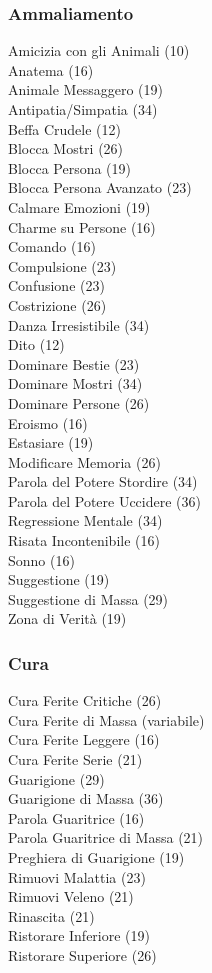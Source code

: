 \begin{multicols}{3}
	\subsubsection{Ammaliamento}
	Amicizia con gli Animali (10)	\\
	Anatema (16)\\
	Animale Messaggero (19)\\
	Antipatia/Simpatia (34)\\
	Beffa Crudele (12)\\
	Blocca Mostri (26)\\
	Blocca Persona (19)\\
	Blocca Persona Avanzato (23)\\
	Calmare Emozioni (19)\\
	Charme su Persone (16)\\
	Comando (16)\\
	Compulsione (23)\\
	Confusione (23)\\
	Costrizione (26)\\
	Danza Irresistibile (34)\\
	Dito (12)\\
	Dominare Bestie (23)\\
	Dominare Mostri (34)\\
	Dominare Persone (26)\\
	Eroismo (16)\\
	Estasiare (19)\\
	Modificare Memoria (26)\\
	Parola del Potere Stordire (34)\\
	Parola del Potere Uccidere (36)\\
	Regressione Mentale (34)\\
	Risata Incontenibile (16)\\
	Sonno (16)\\
	Suggestione (19)\\
	Suggestione di Massa (29)\\
	Zona di Verità (19)\\
	
	\subsubsection{Cura}
Cura Ferite Critiche (26)\\
Cura Ferite di Massa (variabile)\\
Cura Ferite Leggere (16)\\
Cura Ferite Serie (21)\\
Guarigione (29)\\
Guarigione di Massa (36)\\
Parola Guaritrice (16)\\
Parola Guaritrice di Massa (21)\\
Preghiera di Guarigione (19)\\
Rimuovi Malattia (23)\\
Rimuovi Veleno (21)\\
Rinascita (21)\\
Ristorare Inferiore (19)\\
Ristorare Superiore (26)\\	
	

\end{multicols}
